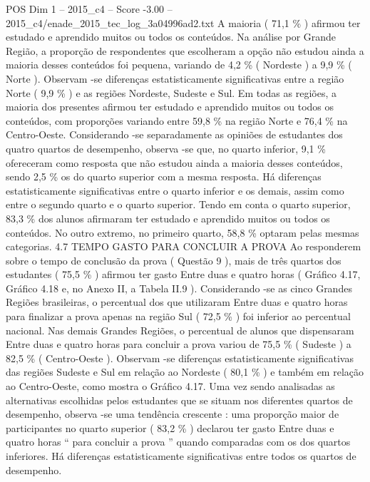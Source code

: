 \begin{textsample}{POS Dim 1 – 2015\_c4 – Score -3.00 – 2015\_c4/enade\_2015\_tec\_log\_3a04996ad2.txt}
A maioria ( 71,1 \% ) afirmou ter estudado e aprendido muitos ou todos os conteúdos.
Na análise por Grande Região, a proporção de respondentes que escolheram a opção não estudou ainda a maioria desses conteúdos foi pequena, variando de 4,2 \% ( Nordeste ) a 9,9 \% ( Norte ).
Observam -se diferenças estatisticamente significativas entre a região Norte ( 9,9 \% ) e as regiões Nordeste, Sudeste e Sul.
Em todas as regiões, a maioria dos presentes afirmou ter estudado e aprendido muitos ou todos os conteúdos, com proporções variando entre 59,8 \% na região Norte e 76,4 \% na Centro-Oeste.
Considerando -se separadamente as opiniões de estudantes dos quatro quartos de desempenho, observa -se que, no quarto inferior, 9,1 \% ofereceram como resposta que não estudou ainda a maioria desses conteúdos, sendo 2,5 \% os do quarto superior com a mesma resposta.
Há diferenças estatisticamente significativas entre o quarto inferior e os demais, assim como entre o segundo quarto e o quarto superior.
Tendo em conta o quarto superior, 83,3 \% dos alunos afirmaram ter estudado e aprendido muitos ou todos os conteúdos.
No outro extremo, no primeiro quarto, 58,8 \% optaram pelas mesmas categorias. 4.7 TEMPO GASTO PARA CONCLUIR A PROVA Ao responderem sobre o tempo de conclusão da prova ( Questão 9 ), mais de três quartos dos estudantes ( 75,5 \% ) afirmou ter gasto Entre duas e quatro horas ( Gráfico 4.17, Gráfico 4.18 e, no Anexo II, a Tabela II.9 ).
Considerando -se as cinco Grandes Regiões brasileiras, o percentual dos que utilizaram Entre duas e quatro horas para finalizar a prova apenas na região Sul ( 72,5 \% ) foi inferior ao percentual nacional.
Nas demais Grandes Regiões, o percentual de alunos que dispensaram Entre duas e quatro horas para concluir a prova variou de 75,5 \% ( Sudeste ) a 82,5 \% ( Centro-Oeste ).
Observam -se diferenças estatisticamente significativas das regiões Sudeste e Sul em relação ao Nordeste ( 80,1 \% ) e também em relação ao Centro-Oeste, como mostra o Gráfico 4.17.
Uma vez sendo analisadas as alternativas escolhidas pelos estudantes que se situam nos diferentes quartos de desempenho, observa -se uma tendência crescente : uma proporção maior de participantes no quarto superior ( 83,2 \% ) declarou ter gasto Entre duas e quatro horas “ para concluir a prova ” quando comparadas com os dos quartos inferiores.
Há diferenças estatisticamente significativas entre todos os quartos de desempenho.

\end{textsample}
